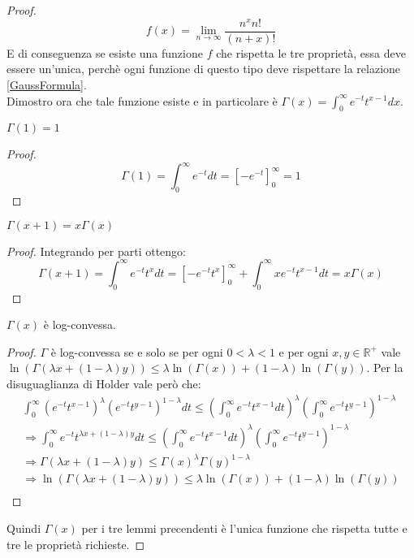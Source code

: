 \begin{proof}
\begin{equation}
\label{GaussFormula}
 f(x)=\lim_{n\rightarrow \infty} \frac{n^xn!}{(n+x)!}
\end{equation}
E di conseguenza se esiste una funzione $f$ che rispetta le tre proprietà, essa deve essere un'unica, perchè ogni
funzione di questo tipo deve rispettare la relazione \cref{GaussFormula}.\\
Dimostro ora che tale funzione esiste e in particolare è 
$\Gamma(x)=\int_0^{\infty}{e^{-t}t^{x-1}dx}$.
\begin{lemma}
 $\Gamma(1)=1$
\end{lemma}
\begin{proof}
       \begin{equation*}
       \Gamma(1)=\int_0^{\infty}{e^{-t}dt}=\left[-e^{-t}\right]_0^{\infty}=1
       \end{equation*}
\end{proof}
\begin{lemma}
 $\Gamma(x+1)=x\Gamma(x)$
\end{lemma}
\begin{proof}
       Integrando per parti ottengo:
       \begin{equation*} 
       \Gamma(x+1)=\int_0^{\infty}{e^{-t}t^xdt}=\left[-e^{-t}t^x\right]_0^{\infty}+\int_0^{\infty}xe^{-t}t^{x-1}dt=x\Gamma(x)
       \end{equation*}
\end{proof}
\begin{lemma}
 \label{GammaLogConvessa}
 $\Gamma(x)$ è log-convessa.
\end{lemma}
\begin{proof}
       $\Gamma$ è log-convessa se e solo se per ogni $0<\lambda < 1$ e per ogni $x,y \in \mathbb{R}^+$ vale 
       $\ln(\Gamma(\lambda x+(1-\lambda)y))\le \lambda \ln(\Gamma(x))+(1-\lambda)\ln(\Gamma(y))$.
       Per la disuguaglianza di Holder vale però che:
       \begin{gather*}
       \int_0^{\infty}{(e^{-t}t^{x-1})^\lambda (e^{-t}t^{y-1})^{1-\lambda}dt} \le 
       \left(\int_0^{\infty}{e^{-t}t^{x-1}dt}\right)^\lambda \left(\int_0^{\infty}{e^{-t}t^{y-1}}\right)^{1-\lambda}\\
       \Longrightarrow \int_0^{\infty}{e^{-t}t^{\lambda x +(1-\lambda)y}dt} \le 
       \left(\int_0^{\infty}{e^{-t}t^{x-1}dt}\right)^\lambda \left(\int_0^{\infty}{e^{-t}t^{y-1}}\right)^{1-\lambda}\\
       \Longrightarrow \Gamma(\lambda x+(1-\lambda)y) \le \Gamma(x)^\lambda\Gamma(y)^{1-\lambda}\\
       \Longrightarrow \ln(\Gamma(\lambda x+(1-\lambda)y)) \le \lambda\ln(\Gamma(x))+(1-\lambda)\ln(\Gamma(y))\\
       \end{gather*}
\end{proof}
Quindi $\Gamma(x)$ per i tre lemmi precendenti è l'unica funzione che rispetta tutte e tre le proprietà richieste.
\end{proof}
